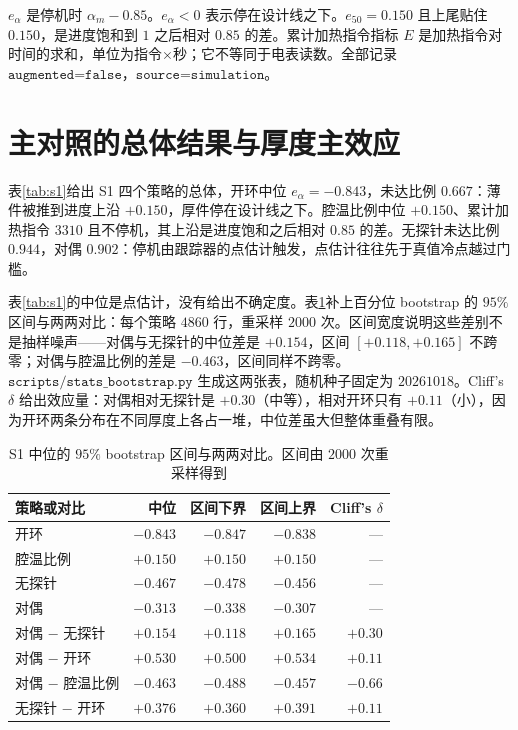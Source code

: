 \(e_{\alpha}\) 是停机时 \(\alpha_m-0.85\)。\(e_{\alpha}<0\) 表示停在设计线之下。\(e_{50}=0.150\) 且上尾贴住 \(0.150\)，是进度饱和到 \(1\) 之后相对 \(0.85\) 的差。累计加热指令指标 \(E\) 是加热指令对时间的求和，单位为指令\(\times\)秒；它不等同于电表读数。全部记录 \(\texttt{augmented=false}\)，\(\texttt{source=simulation}\)。

\section{主对照的总体结果与厚度主效应}

表\ref{tab:s1}{}给出 S1 四个策略的总体，开环中位 \(e_{\alpha}=-0.843\)，未达比例 \(0.667\)：薄件被推到进度上沿 \(+0.150\)，厚件停在设计线之下。腔温比例中位 \(+0.150\)、累计加热指令 \(3310\) 且不停机，其上沿是进度饱和之后相对 \(0.85\) 的差。无探针未达比例 \(0.944\)，对偶 \(0.902\)：停机由跟踪器的点估计触发，点估计往往先于真值冷点越过门槛。

表\ref{tab:s1}{}的中位是点估计，没有给出不确定度。表\ref{tab:s1ci}{}补上百分位 bootstrap 的 \(95\%\) 区间与两两对比：每个策略 \(4860\) 行，重采样 \(2000\) 次。区间宽度说明这些差别不是抽样噪声——对偶与无探针的中位差是 \(+0.154\)，区间 \([+0.118,+0.165]\) 不跨零；对偶与腔温比例的差是 \(-0.463\)，区间同样不跨零。\(\texttt{scripts/stats\_bootstrap.py}\) 生成这两张表，随机种子固定为 \(20261018\)。Cliff's $\delta$ 给出效应量：对偶相对无探针是 \(+0.30\)（中等），相对开环只有 \(+0.11\)（小），因为开环两条分布在不同厚度上各占一堆，中位差虽大但整体重叠有限。

\begin{table}[htbp]
\centering
\caption{S1 中位的 \(95\%\) bootstrap 区间与两两对比。区间由 \(2000\) 次重采样得到}
\label{tab:s1ci}
\setlength{\tabcolsep}{2.8pt}
{\footnotesize
\begin{tabular}{lrrrr}
\toprule
策略或对比 & 中位 & 区间下界 & 区间上界 & Cliff's $\delta$ \\
\midrule
开环 & \(-0.843\) & \(-0.847\) & \(-0.838\) & --- \\
腔温比例 & \(+0.150\) & \(+0.150\) & \(+0.150\) & --- \\
无探针 & \(-0.467\) & \(-0.478\) & \(-0.456\) & --- \\
对偶 & \(-0.313\) & \(-0.338\) & \(-0.307\) & --- \\
\midrule
对偶 \(-\) 无探针 & \(+0.154\) & \(+0.118\) & \(+0.165\) & \(+0.30\) \\
对偶 \(-\) 开环 & \(+0.530\) & \(+0.500\) & \(+0.534\) & \(+0.11\) \\
对偶 \(-\) 腔温比例 & \(-0.463\) & \(-0.488\) & \(-0.457\) & \(-0.66\) \\
无探针 \(-\) 开环 & \(+0.376\) & \(+0.360\) & \(+0.391\) & \(+0.11\) \\
\bottomrule
\end{tabular}}
\end{table}

